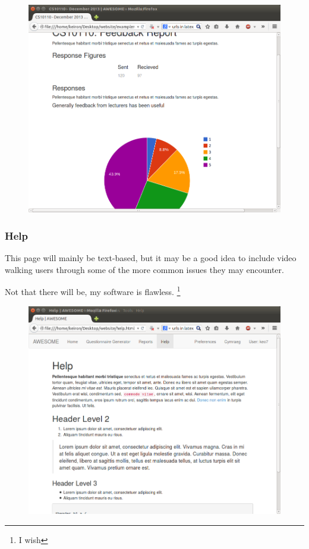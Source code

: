 \documentclass[11pt,a4paper]{article}
\begin{document}
\begin{figure}[h]
\centering
\includegraphics[width=0.85\linewidth]{images/uidesign/modulereport.png}
\end{figure}

\clearpage

\subsubsection{Help}

This page will mainly be text-based, but it may be a good idea to include video walking users through some of the more common issues they may encounter.

Not that there will be, my software is flawless. \footnote{I wish}

\begin{figure}[h]
\centering
\includegraphics[width=0.85\linewidth]{images/uidesign/help.png}
\end{figure}
\end{document}
